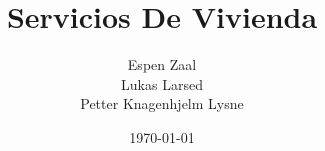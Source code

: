 \begin{titlepage}
 



\title{Servicios De Vivienda}


\author{Espen Zaal\\Lukas Larsed\\Petter Knagenhjelm Lysne}
\date{\today}



\end{titlepage}
